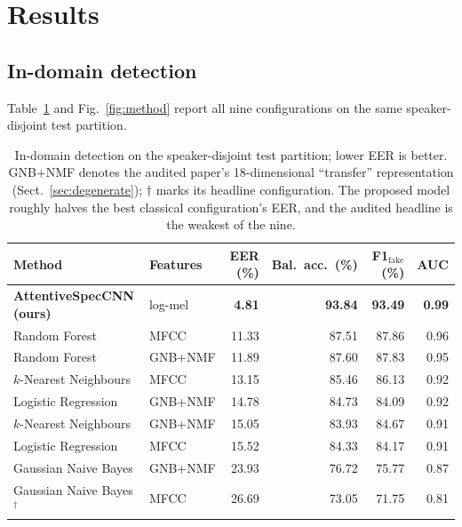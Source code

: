 \documentclass[sn-mathphys-num,pdflatex]{sn-jnl}
\begin{document}
\section{Results}\label{sec:results}

\subsection{In-domain detection}\label{sec:indomain}

Table~\ref{tab:indomain} and Fig.~\ref{fig:method} report all nine
configurations on the same speaker-disjoint test partition.

\begin{table}[t]
\centering
\caption{In-domain detection on the speaker-disjoint test partition; lower EER
is better. GNB+NMF denotes the audited paper's 18-dimensional ``transfer''
representation (Sect.~\ref{sec:degenerate}); $\dagger$ marks its headline
configuration. The proposed model roughly halves the best classical
configuration's EER, and the audited headline is the weakest of the nine.}
\label{tab:indomain}
\small\setlength{\tabcolsep}{4.5pt}
\begin{tabular}{@{}llrrrr@{}}
\toprule
Method & Features & EER (\%) & Bal.\ acc.\ (\%) & F1$_{\text{fake}}$ (\%) & AUC \\
\midrule
\textbf{AttentiveSpecCNN (ours)} & log-mel & \textbf{4.81}  & \textbf{93.84} & \textbf{93.49} & \textbf{0.99} \\
Random Forest          & MFCC    & 11.33 & 87.51 & 87.86 & 0.96 \\
Random Forest          & GNB+NMF & 11.89 & 87.60 & 87.83 & 0.95 \\
$k$-Nearest Neighbours & MFCC    & 13.15 & 85.46 & 86.13 & 0.92 \\
Logistic Regression    & GNB+NMF & 14.78 & 84.73 & 84.09 & 0.92 \\
$k$-Nearest Neighbours & GNB+NMF & 15.05 & 83.93 & 84.67 & 0.91 \\
Logistic Regression    & MFCC    & 15.52 & 84.33 & 84.17 & 0.91 \\
Gaussian Naive Bayes   & GNB+NMF & 23.93 & 76.72 & 75.77 & 0.87 \\
Gaussian Naive Bayes$^{\dagger}$ & MFCC & 26.69 & 73.05 & 71.75 & 0.81 \\
\bottomrule
\end{tabular}
\end{table}
\end{document}
